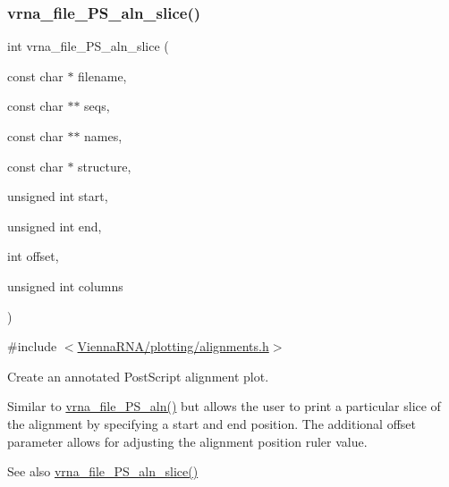 \subsubsection{\texorpdfstring{vrna\_file\_PS\_aln\_slice()}{vrna\_file\_PS\_aln\_slice()}}
{\footnotesize\ttfamily int vrna\+\_\+file\+\_\+\+P\+S\+\_\+aln\+\_\+slice (\begin{DoxyParamCaption}\item[{const char $\ast$}]{filename,  }\item[{const char $\ast$$\ast$}]{seqs,  }\item[{const char $\ast$$\ast$}]{names,  }\item[{const char $\ast$}]{structure,  }\item[{unsigned int}]{start,  }\item[{unsigned int}]{end,  }\item[{int}]{offset,  }\item[{unsigned int}]{columns }\end{DoxyParamCaption})}



{\ttfamily \#include $<$\mbox{\hyperlink{plotting_2alignments_8h}{Vienna\+R\+N\+A/plotting/alignments.\+h}}$>$}



Create an annotated Post\+Script alignment plot. 

Similar to \mbox{\hyperlink{group__alignment__plots_ga3bb7409f5b73c2273f9f76cf8b754034}{vrna\+\_\+file\+\_\+\+P\+S\+\_\+aln()}} but allows the user to print a particular slice of the alignment by specifying a {\ttfamily start} and {\ttfamily end} position. The additional {\ttfamily offset} parameter allows for adjusting the alignment position ruler value.

\begin{DoxySeeAlso}{See also}
\mbox{\hyperlink{group__alignment__plots_ga2b132dddeb2044e52dc39cf0ad8afaee}{vrna\+\_\+file\+\_\+\+P\+S\+\_\+aln\+\_\+slice()}}
\end{DoxySeeAlso}

